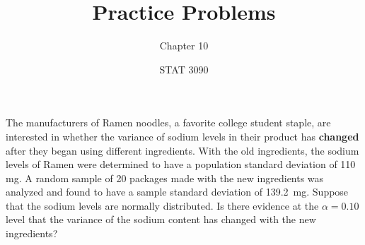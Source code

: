 \documentclass[noanswers]{exam}
\title{Practice Problems}
\author{Chapter 10}
\date{STAT 3090}
\begin{document}
%
%

\noindent The manufacturers of Ramen noodles, a favorite college student staple, are interested in whether the variance of sodium levels in their product has \textbf{changed} after they began using different ingredients. With the old ingredients, the sodium levels of Ramen were determined to have a population standard deviation of 110 mg. A random sample of 20 packages made with the new ingredients was analyzed and found to have a sample standard deviation of 139.2~mg. Suppose that the sodium levels are normally distributed. Is there evidence at the $\alpha=0.10$ level that the variance of the sodium content has changed with the new ingredients?

\vspace{3mm}
\end{document}
